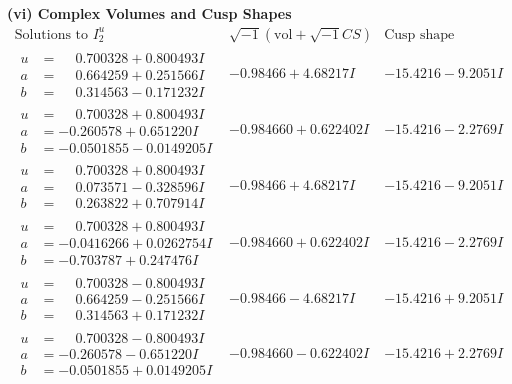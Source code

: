 \documentclass[1p]{elsarticle_modified}
\theoremstyle{definition}
\newcommand{\I}{\sqrt{-1}}
\begin{document}
\newpage\flushleft \textbf{(vi) Complex Volumes and Cusp Shapes}
$$\begin{array}{c|c|c}  
\text{Solutions to }I^u_{2}& \I (\text{vol} + \sqrt{-1}CS) & \text{Cusp shape}\\
 \hline 
\begin{aligned}
u &= \phantom{-}0.700328 + 0.800493 I \\
a &= \phantom{-}0.664259 + 0.251566 I \\
b &= \phantom{-}0.314563 - 0.171232 I\end{aligned}
 & -0.98466 + 4.68217 I & -15.4216 - 9.2051 I \\ \hline\begin{aligned}
u &= \phantom{-}0.700328 + 0.800493 I \\
a &= -0.260578 + 0.651220 I \\
b &= -0.0501855 - 0.0149205 I\end{aligned}
 & -0.984660 + 0.622402 I & -15.4216 - 2.2769 I \\ \hline\begin{aligned}
u &= \phantom{-}0.700328 + 0.800493 I \\
a &= \phantom{-}0.073571 - 0.328596 I \\
b &= \phantom{-}0.263822 + 0.707914 I\end{aligned}
 & -0.98466 + 4.68217 I & -15.4216 - 9.2051 I \\ \hline\begin{aligned}
u &= \phantom{-}0.700328 + 0.800493 I \\
a &= -0.0416266 + 0.0262754 I \\
b &= -0.703787 + 0.247476 I\end{aligned}
 & -0.984660 + 0.622402 I & -15.4216 - 2.2769 I \\ \hline\begin{aligned}
u &= \phantom{-}0.700328 - 0.800493 I \\
a &= \phantom{-}0.664259 - 0.251566 I \\
b &= \phantom{-}0.314563 + 0.171232 I\end{aligned}
 & -0.98466 - 4.68217 I & -15.4216 + 9.2051 I \\ \hline\begin{aligned}
u &= \phantom{-}0.700328 - 0.800493 I \\
a &= -0.260578 - 0.651220 I \\
b &= -0.0501855 + 0.0149205 I\end{aligned}
 & -0.984660 - 0.622402 I & -15.4216 + 2.2769 I \\ \hline\begin{aligned}

\end{aligned}
\end{array}$$
\end{document}
